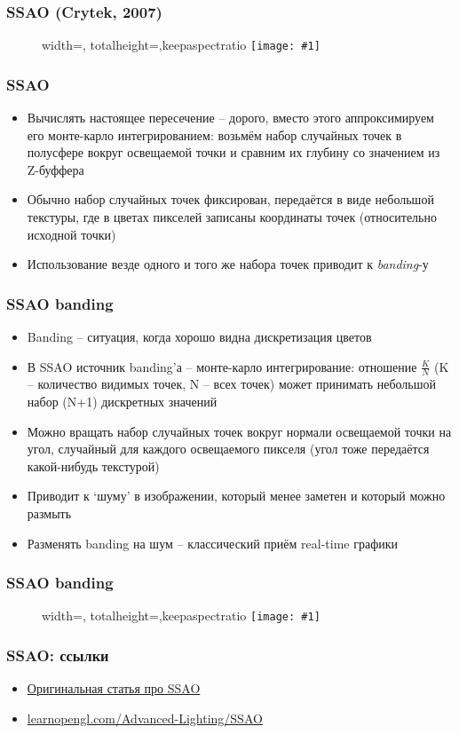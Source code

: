 \documentclass{beamer}
\newcommand{\slideimage}[1]{
  \begin{figure}
    \begin{adjustbox}{width=\textwidth, totalheight=\textheight-2\baselineskip-2\baselineskip,keepaspectratio}
      \texttt{[image: \#1]}
    \end{adjustbox}
  \end{figure}
}
\begin{document}
\begin{frame}[fragile]
\frametitle{SSAO (Crytek, 2007)}
\slideimage{crysis-ao.jpg}
\end{frame}

\begin{frame}[fragile]
\frametitle{SSAO}
\begin{itemize}
\item Вычислять настоящее пересечение -- дорого, вместо этого аппроксимируем его монте-карло интегрированием: возьмём набор случайных точек в полусфере вокруг освещаемой точки и сравним их глубину со значением из Z-буффера
\pause
\item Обычно набор случайных точек фиксирован, передаётся в виде небольшой текстуры, где в цветах пикселей записаны координаты точек (относительно исходной точки)
\pause
\item Использование везде одного и того же набора точек приводит к \textit{banding}-у
\end{itemize}
\end{frame}

\begin{frame}[fragile]
\frametitle{SSAO banding}
\begin{itemize}
\item Banding -- ситуация, когда хорошо видна дискретизация цветов
\pause
\item В SSAO источник banding'а -- монте-карло интегрирование: отношение \begin{math}\frac{K}{N}\end{math} (K -- количество видимых точек, N -- всех точек) может принимать небольшой набор (N+1) дискретных значений
\pause
\item Можно вращать набор случайных точек вокруг нормали освещаемой точки на угол, случайный для каждого освещаемого пикселя (угол тоже передаётся какой-нибудь текстурой)
\pause
\item Приводит к `шуму' в изображении, который менее заметен и который можно размыть
\pause
\item Разменять banding на шум -- классический приём real-time графики
\end{itemize}
\end{frame}

\begin{frame}[fragile]
\frametitle{SSAO banding}
\slideimage{ssao.jpg}
\end{frame}

\begin{frame}[fragile]
\frametitle{SSAO: ссылки}
\begin{itemize}
\item \href{https://artis.inrialpes.fr/Membres/Olivier.Hoel/ssao/nVidiaHSAO/ScreenSpaceAO.pdf}{Оригинальная статья про SSAO}
\item \href{https://learnopengl.com/Advanced-Lighting/SSAO}{learnopengl.com/Advanced-Lighting/SSAO}
\end{itemize}
\end{frame}
\end{document}
